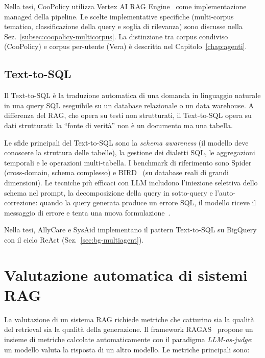 Nella tesi, CooPolicy utilizza Vertex AI RAG Engine~\cite{gcp_vertex_rag} come implementazione managed della pipeline. 
Le scelte implementative specifiche (multi-corpus tematico, classificazione della query e soglia di rilevanza) 
sono discusse nella Sez.~\ref{subsec:coopolicy-multicorpus}. 
La distinzione tra corpus condiviso (CooPolicy) e corpus per-utente (Vera) 
è descritta nel Capitolo~\ref{chap:agenti}.

\subsection{Text-to-SQL}
\label{subsec:bg-text2sql}

Il Text-to-SQL è la traduzione automatica di una domanda in linguaggio naturale in una query SQL eseguibile su un database relazionale o un data warehouse. 
A differenza del RAG, che opera su testi non strutturati, il Text-to-SQL opera su dati strutturati: la ``fonte di verità'' non è un documento ma una tabella.

Le sfide principali del Text-to-SQL sono la \emph{schema awareness} (il modello deve conoscere la struttura delle tabelle), 
la gestione dei dialetti SQL, le aggregazioni temporali e le operazioni multi-tabella. 
I benchmark di riferimento sono Spider~\cite{yu2018spider} (cross-domain, schema complesso) e 
BIRD~\cite{li2023bird} (su database reali di grandi dimensioni). 
Le tecniche più efficaci con LLM includono l'iniezione selettiva dello schema nel prompt, 
la decomposizione della query in sotto-query e l'auto-correzione: quando la query generata produce un errore SQL, 
il modello riceve il messaggio di errore e tenta una nuova formulazione~\cite{pourreza2023dinsql}.

Nella tesi, AllyCare e SysAid implementano il pattern Text-to-SQL su BigQuery con il ciclo ReAct (Sez.~\ref{sec:bg-multiagent}).

\section{Valutazione automatica di sistemi RAG}
\label{sec:bg-ragas}

La valutazione di un sistema RAG richiede metriche che catturino sia la qualità del retrieval sia la qualità della generazione. 
Il framework RAGAS~\cite{es2023ragas} propone un insieme di metriche calcolate automaticamente con il paradigma \emph{LLM-as-judge}: 
un modello valuta la risposta di un altro modello.
Le metriche principali sono:

